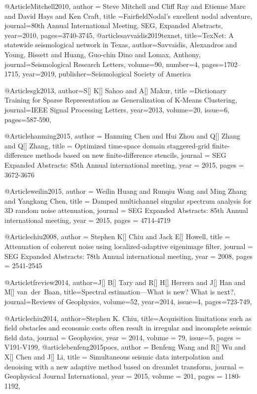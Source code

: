 @Article{Mitchell2010,
  author = {Steve Mitchell and Cliff Ray and Etienne Marc and David Hays and Ken Craft},
  title ={FairfieldNodal's excellent nodal adventure},
  journal={80th Annual International Meeting, SEG, Expanded Abstracts},
  year=2010,
  pages={3740-3745},
}
@article{savvaidis2019texnet,
  title={TexNet: A statewide seismological network in Texas},
  author={Savvaidis, Alexandros and Young, Bissett and Huang, Guo-chin Dino and Lomax, Anthony},
  journal={Seismological Research Letters},
  volume={90},
  number={4},
  pages={1702--1715},
  year={2019},
  publisher={Seismological Society of America}
}

@Article{sgk2013,
  author={S[] K[] Sahoo and A[] Makur},
  title ={Dictionary Training	for	Sparse Representation as Generalization	of K-Means Clustering},
  journal={IEEE Signal Processing Letters},
  year=2013,
  volume=20,
  issue=6,
  pages={587-590},
}


@Article{hanming2015,
  author = 	 {Hanming Chen and Hui Zhou and Q[] Zhang and Q[] Zhang},
  title = 	 {Optimized time-space domain staggered-grid finite-difference methods based on new finite-difference stencils},
  journal = 	 {SEG Expanded Abstracts: 85th Annual international meeting},
  year = 	 2015,
  pages =	 {3672-3676}
}

@Article{weilin2015,
  author = 	 {Weilin Huang and Runqiu Wang and Ming Zhang and Yangkang Chen},
  title = 	 {Damped multichannel singular spectrum analysis for 3D random noise attenuation},
  journal = 	 {SEG Expanded Abstracts: 85th Annual international meeting},
  year = 	 2015,
  pages =	 {4714-4719}
}


@Article{chiu2008,
  author = 	 {Stephen K[] Chiu and Jack E[] Howell},
  title = 	 {Attenuation of coherent noise using localized‐adaptive eigenimage filter},
  journal = 	 {SEG Expanded Abstracts: 78th Annual international meeting},
  year = 	 2008,
  pages =	 {2541-2545}
}



@Article{tfreview2014,
author={J[] B[] Tary and R[] H[] Herrera and J[] Han and M[] van~der~Baan},
title={Spectral estimation—What is new? What is next?},
journal={Reviews of Geophysics},
volume=52,
year=2014,
issue=4,
pages={723-749},
}

@Article{chiu2014,
  author={Stephen K. Chiu},
  title={Acquisition limitations such as field obstacles and economic costs often result in irregular and incomplete seismic field data},
  journal = 	 {Geophysics},
  year = 	 2014,
  volume =	 79,
  issue=5,
  pages =	 {V191-V199},
}
@article{benfeng2015pocs,
  author =	 {Benfeng Wang and R[] Wu and X[] Chen and J[] Li},
  title =	 {Simultaneous seismic data interpolation and denoising with a new adaptive method based on dreamlet transform},
  journal = 	 {Geophysical Journal International},
  year = 	 2015,
  volume =	 201,
  pages =	 {1180-1192},
}


